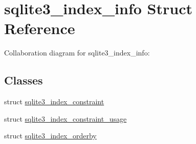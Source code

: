 \hypertarget{structsqlite3__index__info}{\section{sqlite3\+\_\+index\+\_\+info Struct Reference}
\label{structsqlite3__index__info}
}


Collaboration diagram for sqlite3\+\_\+index\+\_\+info\+:
\subsection*{Classes}
\begin{DoxyCompactItemize}
\item 
struct \hyperlink{structsqlite3__index__info_1_1sqlite3__index__constraint}{sqlite3\+\_\+index\+\_\+constraint}
\item 
struct \hyperlink{structsqlite3__index__info_1_1sqlite3__index__constraint__usage}{sqlite3\+\_\+index\+\_\+constraint\+\_\+usage}
\item 
struct \hyperlink{structsqlite3__index__info_1_1sqlite3__index__orderby}{sqlite3\+\_\+index\+\_\+orderby}
\end{DoxyCompactItemize}
